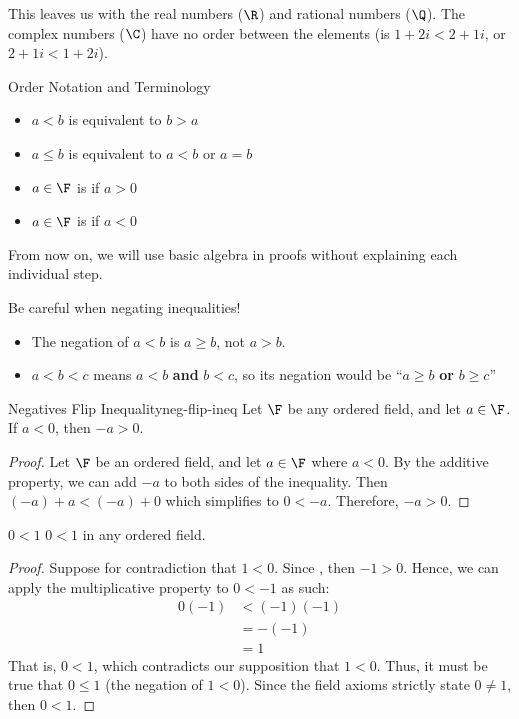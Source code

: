 \documentclass[letterpaper,12pt]{report}
\begin{document}
This leaves us with the real numbers ($\R$) and rational numbers ($\Q$). The complex numbers ($\C$) have no order between the elements (is $1+2i < 2+1i$, or $2+1i < 1 + 2i$).

\begin{genbox}{Order Notation and Terminology}
	\begin{itemize}
		\item $a<b$ is equivalent to $b>a$
		\item $a \leq b$ is equivalent to $a<b$ or $a=b$
		\item $a \in \F$ is  if $a>0$
		\item $a \in \F$ is  if $a < 0$
	\end{itemize}
\end{genbox}

From now on, we will use basic algebra in proofs without explaining each individual step.

\begin{notebox}{}
	Be careful when negating inequalities!
	\begin{itemize}
		\item The negation of $a < b$ is $a \geq b$, not $a > b$.
		\item $a < b < c$ means $a < b$ \textbf{and} $b < c$, so its negation would be ``$a \geq b$ \textbf{or} $b \geq c$''
	\end{itemize}
\end{notebox}

\begin{thmbox}{Negatives Flip Inequality}{neg-flip-ineq}
	Let $\F$ be any ordered field, and let $a \in \F$. If $a<0$, then $-a > 0$.
	\tcblower
	\begin{proof}
		Let $\F$ be an ordered field, and let $a \in \F$ where $a<0$. By the additive property, we can add $-a$ to both sides of the inequality. Then $(-a) + a < (-a) + 0$ which simplifies to $0 < -a$. Therefore, $-a > 0$.
	\end{proof}
\end{thmbox}

\begin{thmbox}{$0<1$}{}
	$0<1$ in any ordered field.
	\tcblower
	\begin{proof}
		Suppose for contradiction that $1<0$. Since , then $-1>0$. Hence,  we can apply the multiplicative property to $0 < -1$ as such:
		\begin{align*}
			0 (-1) &< (-1)(-1) \\
			&= -(-1) \\
			&= 1
		\end{align*}
		That is, $0<1$, which contradicts our supposition that $1<0$. Thus, it must be true that $0 \leq 1$ (the negation of $1 < 0$). Since the field axioms strictly state $0 \neq 1$, then $0 < 1$.
	\end{proof}
\end{thmbox}
\end{document}

